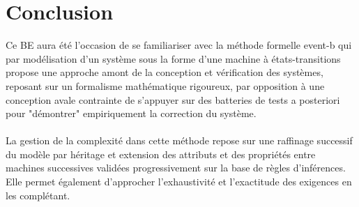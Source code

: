 \section*{Conclusion}


Ce BE aura été l'occasion de se familiariser avec la méthode formelle event-b qui par modélisation d'un système sous la forme d'une machine à états-transitions propose une approche amont de la conception et vérification des systèmes, reposant sur un formalisme mathématique rigoureux, par opposition à une conception avale contrainte de s'appuyer sur des batteries de tests a posteriori pour "démontrer" empiriquement la correction du système.

\paragraph{}
La gestion de la complexité  dans cette méthode repose sur une raffinage successif du modèle par héritage et extension des attributs et des propriétés entre machines successives validées progressivement sur la base de règles d'inférences. Elle permet également d'approcher l'exhaustivité et l'exactitude des exigences en les complétant.
